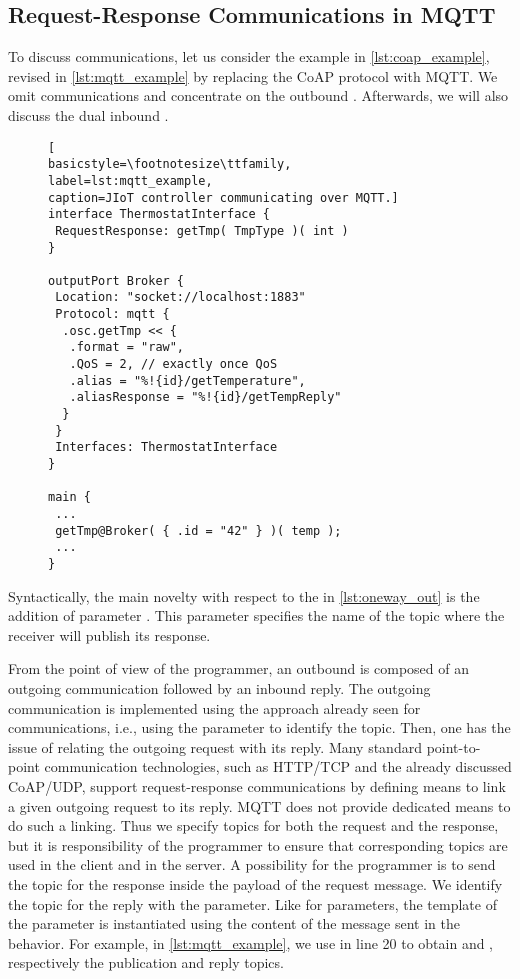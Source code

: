 \subsection{Request-Response Communications in MQTT}
\label{sub:rr_in_mqtt}

To discuss  communications, let us consider the
example in \cref{lst:coap_example}, revised in \cref{lst:mqtt_example}
by replacing the CoAP protocol with MQTT. We omit 
communications and concentrate on the
outbound . Afterwards, we will also discuss the
dual inbound .

\begin{figure}[t]
 \begin{lstlisting}[
basicstyle=\footnotesize\ttfamily,
label=lst:mqtt_example,
caption=JIoT controller communicating over MQTT.]
interface ThermostatInterface {
 RequestResponse: getTmp( TmpType )( int )
}

outputPort Broker {
 Location: "socket://localhost:1883"
 Protocol: mqtt {
  .osc.getTmp << {
   .format = "raw",
   .QoS = 2, // exactly once QoS
   .alias = "%!{id}/getTemperature",
   .aliasResponse = "%!{id}/getTempReply"
  }
 }
 Interfaces: ThermostatInterface
}

main {
 ...
 getTmp@Broker( { .id = "42" } )( temp );
 ...
}
\end{lstlisting}
\end{figure}

Syntactically, the main novelty with respect to the  in
\cref{lst:oneway_out} is the addition of  parameter
. This parameter specifies the name of the topic
where the receiver will publish its response.

From the point of view of the programmer, an outbound  is
composed of an outgoing communication followed by an inbound reply. The outgoing
communication is implemented using the approach already seen for 
communications, i.e., using the   parameter to
identify the topic. Then, one has the issue of relating the outgoing request
with its reply. Many standard point-to-point communication technologies, such as
HTTP/TCP and the already discussed CoAP/UDP, support request-response
communications by defining means to link a given outgoing request to its reply.
MQTT does not provide dedicated means to do such a linking.
Thus we specify topics for both the request and the response, but it is responsibility of the programmer to ensure that corresponding topics are used in the client and in the server. A possibility for the programmer is to send the topic for the response inside the payload of the request message.
%
We identify the topic for the reply with the
  parameter. Like for 
parameters, the template of the  parameter is instantiated
using the content of the message sent in the behavior. For example, in
\cref{lst:mqtt_example}, we use  in line 20 to obtain
 and , respectively the
publication and reply topics.

